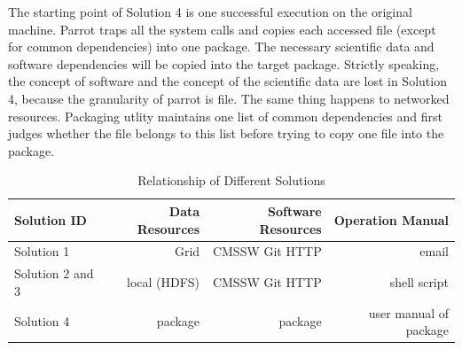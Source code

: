 \documentclass{acm_proc_article-sp}
\begin{document}
The starting point of Solution 4 is one successful execution on the original machine. 
Parrot traps all the system calls and copies each accessed file (except for common dependencies) into one package.
The necessary scientific data and software dependencies will be copied into the target package.
Strictly speaking, the concept of software and the concept of the scientific data are lost in Solution 4, because
the granularity of parrot is file.
The same thing happens to networked resources.
Packaging utlity maintains one list of common dependencies and first judges whether the file belongs to this list before trying to copy one file into the package.

\begin{table}
    \centering
    \begin{tabular}{|l|r|r|r|}
        \hline
        \bf Solution ID & \bf Data Resources &\bf Software Resources & \bf Operation Manual \\ \hline
        Solution 1& Grid & CMSSW Git HTTP & email \\ \hline
        Solution 2 and 3& local (HDFS) & CMSSW Git HTTP & shell script \\ \hline
        Solution 4& package & package & user manual of package \\ \hline
    \end{tabular}
    \caption{Relationship of Different Solutions}
    \label{table:relationship}
\end{table}



\end{document}
